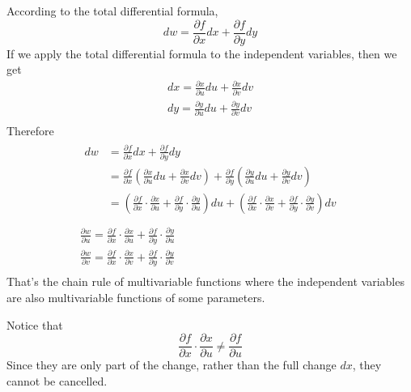 \documentclass{article}
\begin{document}
According to the total differential formula,
\begin{equation*}
  dw = \frac{\partial f}{\partial x}dx + \frac{\partial f}{\partial y}dy
\end{equation*}
If we apply the total differential formula to the independent variables, then we 
get
\begin{gather*}
  dx = \frac{\partial x}{\partial u}du + \frac{\partial x}{\partial v}dv \\
  dy = \frac{\partial y}{\partial u}du + \frac{\partial y}{\partial v}dv \\
\end{gather*}
Therefore
\begin{gather*}
  \begin{split}
    dw &= \frac{\partial f}{\partial x}dx + \frac{\partial f}{\partial y}dy \\
       &= \frac{\partial f}{\partial x}(\frac{\partial x}{\partial u}du + \frac{\partial x}{\partial v}dv) + \frac{\partial f}{\partial y}(\frac{\partial y}{\partial u}du + \frac{\partial y}{\partial v}dv) \\
       &= (\frac{\partial f}{\partial x} \cdot \frac{\partial x}{\partial u} + \frac{\partial f}{\partial y} \cdot \frac{\partial y}{\partial u})du + (\frac{\partial f}{\partial x} \cdot \frac{\partial x}{\partial v} + \frac{\partial f}{\partial y} \cdot \frac{\partial y}{\partial v})dv \\
  \end{split} \\
  \frac{\partial w}{\partial u} = \frac{\partial f}{\partial x} \cdot \frac{\partial x}{\partial u} + \frac{\partial f}{\partial y} \cdot \frac{\partial y}{\partial u} \\
  \frac{\partial w}{\partial v} = \frac{\partial f}{\partial x} \cdot \frac{\partial x}{\partial v} + \frac{\partial f}{\partial y} \cdot \frac{\partial y}{\partial v} \\
\end{gather*}
That's the chain rule of multivariable functions where the independent variables 
are also multivariable functions of some parameters.

Notice that
\begin{equation*}
  \frac{\partial f}{\partial x} \cdot \frac{\partial x}{\partial u} \neq \frac{\partial f}{\partial u}
\end{equation*}
Since they are only part of the change, rather than the full change $dx$, they 
cannot be cancelled.
\end{document}

